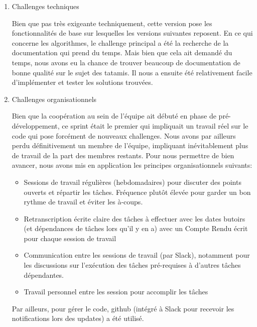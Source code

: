 \begin{enumerate}
    \item Challenges techniques

          Bien que pas très exigeante techniquement, cette version pose les fonctionnalités de base sur lesquelles
          les versions suivantes reposent. En ce qui concerne les algorithmes, le challenge principal a été la recherche
          de la documentation qui prend du temps. Mais bien que cela ait demandé du temps, nous avons eu la chance de
          trouver beaucoup de documentation de bonne qualité sur le sujet des tatamis. Il nous a ensuite été relativement
          facile d'implémenter et tester les solutions trouvées.

    \item Challenges organisationnels

          Bien que la coopération au sein de l'équipe ait débuté en phase de pré-développement, ce sprint était le premier
          qui impliquait un travail réel sur le code qui pose forcément de nouveaux challenges. Nous avons par ailleurs perdu
          définitivement un membre de l'équipe, impliquant inévitablement plus de travail de la part des membres restants.
          Pour nous permettre de bien avancer, nous avons mis en application les principes organisationnels suivants:
          \begin{itemize}
              \item Sessions de travail régulières (hebdomadaires) pour discuter des points ouverts et répartir
                    les tâches. Fréquence plutôt élevée pour garder un bon rythme de travail et éviter les à-coups.
              \item Retranscription écrite claire des tâches à effectuer avec les dates butoirs (et dépendances
                    de tâches lors qu’il y en a) avec un Compte Rendu écrit pour chaque session de travail
              \item Communication entre les sessions de travail (par Slack), notamment pour les discussions sur
                    l'exécution des tâches pré-requises à d'autres tâches dépendantes.
              \item Travail personnel entre les session pour accomplir les tâches

          \end{itemize}

          Par ailleurs, pour gérer le code, github (intégré à Slack pour recevoir les notifications lors des updates)
          a été utilisé.

\end{enumerate}


